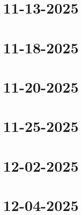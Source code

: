 \documentclass[]{mangos-musings}
\begin{document}
\newpage
\section{11-13-2025}

\newpage
\section{11-18-2025}

\newpage
\section{11-20-2025}

\newpage
\section{11-25-2025}

\newpage
\section{12-02-2025}

\newpage
\section{12-04-2025}
\end{document}
